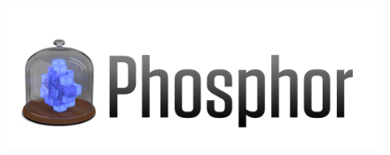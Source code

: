 
\thispagestyle{empty} %



\begin{figure}[H]
\hspace{0.5cm}
\includegraphics[scale = 0.2,left]{images/Phosphor-Logo-Large.png}
\end{figure}





\vfill %


